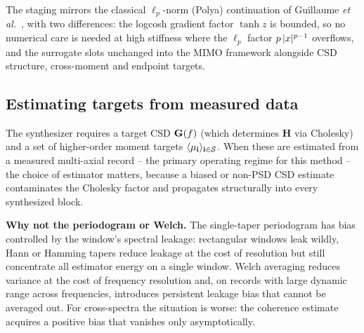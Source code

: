 \documentclass[10pt,a4paper]{article}
\numberwithin{equation}{section}
\DeclarePairedDelimiter\abs{\lvert}{\rvert}
\DeclarePairedDelimiter\seq{\langle}{\rangle}
\DeclarePairedDelimiter\mat{(}{)}
\begin{document}
The staging mirrors the classical $\ell_p$-norm (Polya) continuation of Guillaume \emph{et al.}~\cite{guillaume1991crest}, with two differences: the logcosh gradient factor $\tanh z$ is bounded, so no numerical care is needed at high stiffness where the $\ell_p$ factor $p\,\abs{x}^{p-1}$ overflows, and the surrogate slots unchanged into the MIMO framework alongside CSD structure, cross-moment and endpoint targets.

\subsection*{Estimating targets from measured data}

The synthesizer requires a target CSD $\mathbf{G}\mat{f}$ (which determines $\mathbf{H}$ via Cholesky) and a set of higher-order moment targets $\seq{\mu_\mathbf{i}}_{\mathbf{i}\in\mathcal{S}}$. When these are estimated from a measured multi-axial record -- the primary operating regime for this method -- the choice of estimator matters, because a biased or non-PSD CSD estimate contaminates the Cholesky factor and propagates structurally into every synthesized block.

\textbf{Why not the periodogram or Welch.} The single-taper periodogram has bias controlled by the window's spectral leakage: rectangular windows leak wildly, Hann or Hamming tapers reduce leakage at the cost of resolution but still concentrate all estimator energy on a single window. Welch averaging reduces variance at the cost of frequency resolution and, on records with large dynamic range across frequencies, introduces persistent leakage bias that cannot be averaged out. For cross-spectra the situation is worse: the coherence estimate acquires a positive bias that vanishes only asymptotically.
\end{document}
